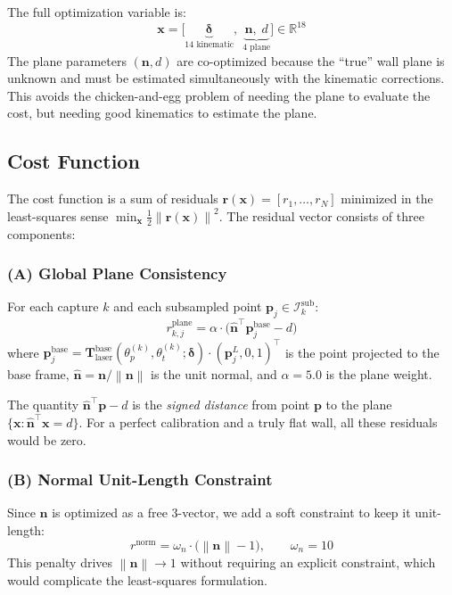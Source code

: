\documentclass[12pt,a4paper]{article}
\newcommand{\R}{\mathbb{R}}
\newcommand{\T}{\mathbf{T}}
\newcommand{\nh}{\hat{\mathbf{n}}}
\newcommand{\nraw}{\mathbf{n}}
\newcommand{\pvec}{\mathbf{p}}
\newcommand{\norm}[1]{\left\|#1\right\|}
\begin{document}
The full optimization variable is:
\begin{equation}
    \mathbf{x} = \bigl[\underbrace{\bm{\delta}}_{\text{14 kinematic}},\;
    \underbrace{\nraw,\; d}_{\text{4 plane}}\bigr] \in \R^{18}
    \label{eq:opt_vars}
\end{equation}
The plane parameters $(\nraw, d)$ are co-optimized because the ``true'' wall
plane is unknown and must be estimated simultaneously with the kinematic
corrections. This avoids the chicken-and-egg problem of needing the plane
to evaluate the cost, but needing good kinematics to estimate the plane.

\subsection{Cost Function}
\label{sec:cost}

The cost function is a sum of residuals
$\mathbf{r}(\mathbf{x}) = [r_1, \ldots, r_N]$ minimized in the
least-squares sense $\min_{\mathbf{x}} \frac{1}{2}\norm{\mathbf{r}(\mathbf{x})}^2$.
The residual vector consists of three components:

\subsubsection{(A) Global Plane Consistency}

For each capture $k$ and each subsampled point $\pvec_j \in \mathcal{I}_k^{\text{sub}}$:
\begin{equation}
    r_{k,j}^{\text{plane}} = \alpha \cdot \bigl(\nh^\top \pvec_{j}^{\text{base}} - d\bigr)
    \label{eq:plane_residual}
\end{equation}
where $\pvec_j^{\text{base}} = \T_{\text{laser}}^{\text{base}}(\theta_p^{(k)}, \theta_t^{(k)}; \bm{\delta}) \cdot (\pvec_j^L, 0, 1)^\top$
is the point projected to the base frame, $\nh = \nraw / \norm{\nraw}$
is the unit normal, and $\alpha = 5.0$ is the plane weight.

The quantity $\nh^\top \pvec - d$ is the \emph{signed distance} from
point $\pvec$ to the plane $\{\mathbf{x} : \nh^\top \mathbf{x} = d\}$.
For a perfect calibration and a truly flat wall, all these residuals
would be zero.

\subsubsection{(B) Normal Unit-Length Constraint}

Since $\nraw$ is optimized as a free 3-vector, we add a soft constraint
to keep it unit-length:
\begin{equation}
    r^{\text{norm}} = \omega_n \cdot \bigl(\norm{\nraw} - 1\bigr),
    \qquad \omega_n = 10
    \label{eq:norm_constraint}
\end{equation}
This penalty drives $\norm{\nraw} \to 1$ without requiring an explicit
constraint, which would complicate the least-squares formulation.
\end{document}
